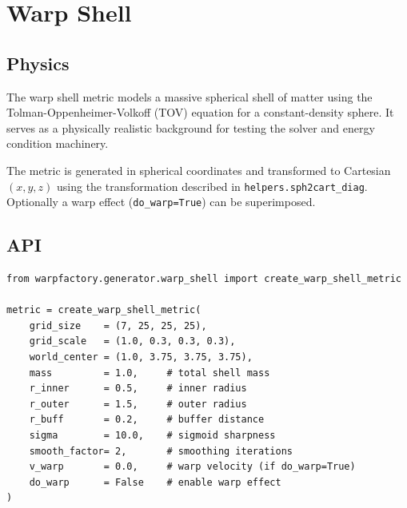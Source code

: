 \documentclass[11pt, a4paper, twoside]{report}
\begin{document}
\section{Warp Shell}
\label{sec:warpshell}

\subsection{Physics}

The warp shell metric models a massive spherical shell of matter using
the Tolman-Oppenheimer-Volkoff (TOV) equation for a constant-density
sphere.  It serves as a physically realistic background for testing the
solver and energy condition machinery.

The metric is generated in spherical coordinates and transformed to
Cartesian $(x, y, z)$ using the transformation described in
\texttt{helpers.sph2cart\_diag}.  Optionally a warp effect
(\texttt{do\_warp=True}) can be superimposed.

\subsection{API}

\begin{lstlisting}[caption={Warp shell metric}]
from warpfactory.generator.warp_shell import create_warp_shell_metric

metric = create_warp_shell_metric(
    grid_size    = (7, 25, 25, 25),
    grid_scale   = (1.0, 0.3, 0.3, 0.3),
    world_center = (1.0, 3.75, 3.75, 3.75),
    mass         = 1.0,     # total shell mass
    r_inner      = 0.5,     # inner radius
    r_outer      = 1.5,     # outer radius
    r_buff       = 0.2,     # buffer distance
    sigma        = 10.0,    # sigmoid sharpness
    smooth_factor= 2,       # smoothing iterations
    v_warp       = 0.0,     # warp velocity (if do_warp=True)
    do_warp      = False    # enable warp effect
)
\end{lstlisting}
\end{document}
